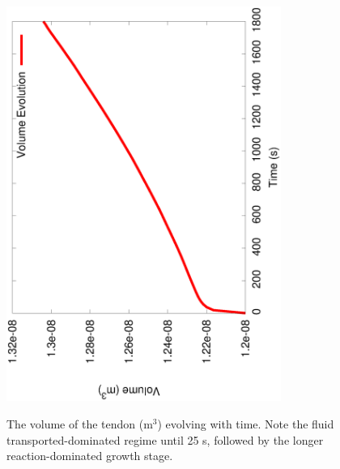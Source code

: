 \begin{figure}[!hpt]
  \centering
     {\includegraphics[angle=270,width=0.8\textwidth]{images/examples/lagrangian/swelling/volume-evolution-3}}
     \caption{The volume of the tendon (m$^3$) evolving with
     time. Note the fluid transported-dominated regime until 25 s,
     followed by the longer reaction-dominated growth stage.}
     \label{volume_evolution}
\end{figure}

